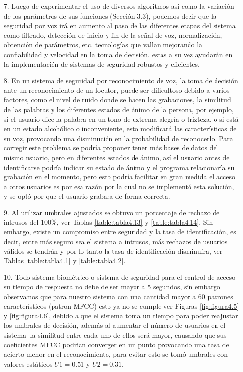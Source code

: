 \begin{enumerate}
\item[7.]Luego de experimentar el uso de diversos algoritmos así como la variación de los parámetros de sus funciones (Sección 3.3), podemos decir que la seguridad por voz irá en aumento al paso de las diferentes etapas del sistema como filtrado, detección de inicio y fin de la señal de voz, normalización, obtención de parámetros, etc. tecnologías que vallan mejorando la confiabilidad y velocidad en la toma de decisión, estas a su vez ayudarán en la implementación de sistemas de seguridad robustos y eficientes.

\item[8.]En un sistema de seguridad por reconocimiento de voz, la toma de decisión ante un reconocimiento de un locutor, puede ser dificultoso debido a varios factores, como el nivel de ruido donde se hacen las grabaciones, la similitud de las palabras y los diferentes estados de ánimo de la persona, por ejemplo, si el usuario dice la palabra en un tono de extrema alegría o trizteza, o si está en un estado alcohólico o inconveniente, esto modificará las características de su voz, provocando una disminución en la probabilidad de reconocerlo.
\vskip 0.5cm
Para corregir este problema se podría proponer tener más bases de datos del mismo usuario, pero en diferentes estados de ánimo, así el usuario antes de identificarse podría indicar su estado de ánimo y el programa relacionaría su grabación en el momento, pero esto podría facilitar en gran medida el acceso a otros usuarios es por esa razón por la cual no se implementó esta solución, y se optó por que el usuario grabara de forma correcta.

\item[9.]Al utilizar umbrales ajustados se obtuvo un porcentaje de rechazo de intrusos del 100\%, ver Tablas \ref{table:tabla4.13} y \ref{table:tabla4.14}. Sin embargo, existe un compromiso entre seguridad y la tasa de identificación, es decir, entre más seguro sea el sistema a intrusos, más rechazos de usuarios válidos se tendrán y por lo tanto la tasa de identificación disminuíra, ver Tablas \ref{table:tabla4.1} y \ref{table:tabla4.2}.

\item[10.]Todo sistema biométrico o sistema de seguridad para el control de acceso su tiempo de respuesta no debe de ser mayor a 5 segundos, sin embargo observamos que para nuestro sistema con una cantidad mayor a 60 patrones característicos (patron MFCC) esto ya no se cumple ver Figuras \ref{fig:figura4.5} y \ref{fig:figura4.6}, debido a que el sistema toma un tiempo para poder reajustar los umbrales de decisión, además al aumentar el número de usuarios en el sistema, la similitud entre cada uno de ellos será mayor, causando que sus coeficientes MFCC podrían converger en un punto provocando una tasa de acierto menor en el reconocimiento, para evitar esto se tomó umbrales con valores estáticos $U1=0.51$ y $U2=0.31$.


\end{enumerate}
